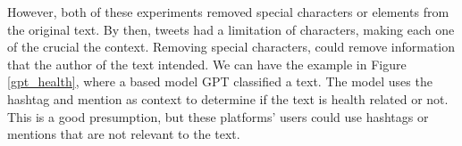 However, both of these experiments removed special characters or elements from the original text. By then, tweets had a limitation of characters, making each one of the crucial the context. Removing special
characters, could remove information that the author of the text intended. We can have the example in Figure \ref{gpt_health}, where a based model GPT classified a text. The model uses the hashtag and mention
as context to determine if the text is health related or not. This is a good presumption, but these platforms' users could use hashtags or mentions that are not relevant to the text. 



